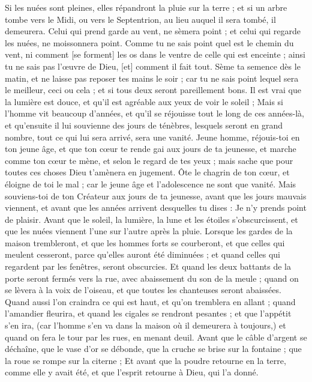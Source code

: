 \begin{multicols}{2}
Si les nuées sont pleines, elles répandront la pluie sur la terre ; et si un arbre tombe vers le Midi, ou vers le Septentrion, au lieu auquel il sera tombé, il demeurera.
Celui qui prend garde au vent, ne sèmera point ; et celui qui regarde les nuées, ne moissonnera point.
Comme tu ne sais point quel est le chemin du vent, ni comment [se forment] les os dans le ventre de celle qui est enceinte ; ainsi tu ne sais pas l'œuvre de Dieu, [et] comment il fait tout.
Sème ta semence dès le matin, et ne laisse pas reposer tes mains le soir ; car tu ne sais point lequel sera le meilleur, ceci ou cela ; et si tous deux seront pareillement bons.
Il est vrai que la lumière est douce, et qu'il est agréable aux yeux de voir le soleil ;
Mais si l'homme vit beaucoup d'années, et qu'il se réjouisse tout le long de ces années-là, et qu'ensuite il lui souvienne des jours de ténèbres, lesquels seront en grand nombre, tout ce qui lui sera arrivé, sera une vanité.
\VerseOne{}Jeune homme, réjouis-toi en ton jeune âge, et que ton cœur te rende gai aux jours de ta jeunesse, et marche comme ton cœur te mène, et selon le regard de tes yeux ; mais sache que pour toutes ces choses Dieu t'amènera en jugement.
Ôte le chagrin de ton cœur, et éloigne de toi le mal ; car le jeune âge et l'adolescence ne sont que vanité.
Mais souviens-toi de ton Créateur aux jours de ta jeunesse, avant que les jours mauvais viennent, et avant que les années arrivent desquelles tu dises : Je n'y prends point de plaisir.
Avant que le soleil, la lumière, la lune et les étoiles s'obscurcissent, et que les nuées viennent l'une sur l'autre après la pluie.
Lorsque les gardes de la maison trembleront, et que les hommes forts se courberont, et que celles qui meulent cesseront, parce qu'elles auront été diminuées ; et quand celles qui regardent par les fenêtres, seront obscurcies.
Et quand les deux battants de la porte seront fermés vers la rue, avec abaissement du son de la meule ; quand on se lèvera à la voix de l'oiseau, et que toutes les chanteuses seront abaissées.
Quand aussi l'on craindra ce qui est haut, et qu'on tremblera en allant ; quand l'amandier fleurira, et quand les cigales se rendront pesantes ; et que l'appétit s'en ira, (car l'homme s'en va dans la maison où il demeurera à toujours,) et quand on fera le tour par les rues, en menant deuil.
Avant que le câble d'argent se déchaîne, que le vase d'or se débonde, que la cruche se brise sur la fontaine ; que la roue se rompe sur la citerne ;
Et avant que la poudre retourne en la terre, comme elle y avait été, et que l'esprit retourne à Dieu, qui l'a donné.

\end{multicols}
